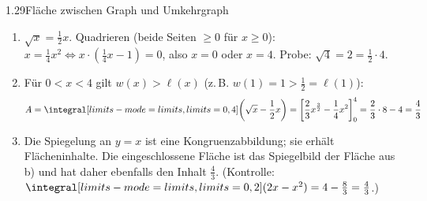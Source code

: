 \begin{loesung}{1.29}{Fläche zwischen Graph und Umkehrgraph}
\begin{enumerate}[label=\alph*)]
  \item $\sqrt{x} = \frac{1}{2}x$. Quadrieren (beide Seiten $\geq 0$ für $x\geq 0$): $x = \frac{1}{4}x^2\Longleftrightarrow x\cdot(\frac{1}{4}x-1) = 0$, also $x=0$ oder $x=4$. Probe: $\sqrt{4} = 2 = \frac{1}{2}\cdot 4$. \checkmark
  \item Für $0<x<4$ gilt $w(x)>\ell(x)$ (z.\,B. $w(1)=1>\frac{1}{2}=\ell(1)$):
  \[A = \integral[limits-mode=limits,limits={0, 4}]{\left(\sqrt{x}-\dfrac{1}{2}x\right)} = \left[\dfrac{2}{3}x^{\frac{3}{2}}-\dfrac{1}{4}x^2\right]_0^4 = \dfrac{2}{3}\cdot 8-4 = \dfrac{4}{3}\]
  \item Die Spiegelung an $y=x$ ist eine Kongruenzabbildung; sie erhält Flächeninhalte. Die eingeschlossene Fläche ist das Spiegelbild der Fläche aus b) und hat daher ebenfalls den Inhalt $\frac{4}{3}$. (Kontrolle: $\integral[limits-mode=limits,limits={0, 2}]{(2x-x^2)} = 4-\frac{8}{3} = \frac{4}{3}$.)
\end{enumerate}
\end{loesung}


